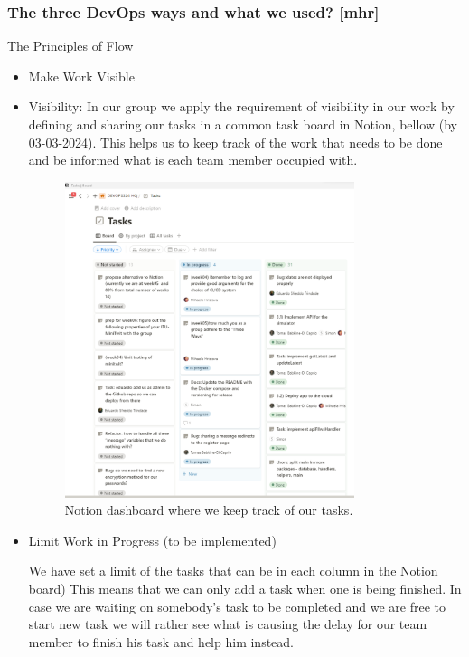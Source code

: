 \documentclass{article}
\begin{document}
\subsubsection{The three DevOps ways and what we used? [mhr]} 

The Principles of Flow

\begin{itemize}

\item Make Work Visible
  \item Visibility:  In our group we apply the requirement of visibility in our work by defining and sharing our tasks in a common task board in Notion, bellow (by 03-03-2024). This helps us to keep track of the work that needs to be done and be informed what is each team member occupied with.

\begin{figure}[ht]
    \centering
    \includegraphics[width=0.8\textwidth]{./images/notion-dashboard-visibility-three-ways.png}
    \caption{Notion dashboard where we keep track of our tasks.}
    \label{fig:notion-dashboard}
\end{figure}
    
\item Limit Work in Progress
(to be implemented)

We have set a limit of the tasks  that can  be in each column in the Notion board) This means that we can only add a task when one is being finished. In case we are waiting on somebody’s task to be completed and we are free to start new task we will rather see what is causing the delay for our team member to finish his task and help him instead. 


\end{itemize}
\end{document}
